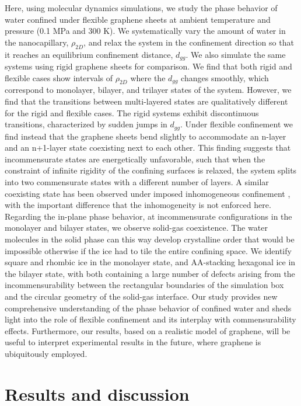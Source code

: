 \documentclass[journal=acsnano,manuscript=article]{achemso}
\begin{document}
	Here, using molecular dynamics simulations, we study the phase behavior of water confined under flexible graphene sheets at ambient temperature and pressure (0.1 MPa and 300 K). We systematically vary the amount of water in the nanocapillary, \(\rho_{2D}\), and relax the system in the confinement direction so that it reaches an equilibrium confinement distance, \(d_{gg}\). We also simulate the same systems using rigid graphene sheets for comparison. We find that both rigid and flexible cases show intervals of \(\rho_{2D}\) where the \(d_{gg}\) changes smoothly, which correspond to monolayer, bilayer, and trilayer states of the system. However, we find that the transitions between multi-layered states are qualitatively different for the rigid and flexible cases. The rigid systems exhibit discontinuous transitions, characterized by sudden jumps in \(d_{gg}\). Under flexible confinement we find instead that the graphene sheets bend slightly to accommodate an n-layer and an n+1-layer state coexisting next to each other. This finding suggests that incommensurate states are energetically unfavorable, such that when the constraint of infinite rigidity of the confining surfaces is relaxed, the system splits into two commensurate states with a different number of layers. A similar coexisting state has been observed under imposed inhomogeneous confinement \cite{Qiu2015}, with the important difference that the inhomogeneity is not enforced here. Regarding the in-plane phase behavior, at incommensurate configurations in the monolayer and bilayer states, we observe solid-gas coexistence. The water molecules in the solid phase can this way develop crystalline order that would be impossible otherwise if the ice had to tile the entire confining space. We identify square and rhombic ice in the monolayer state, and AA-stacking hexagonal ice in the bilayer state, with both containing a large number of defects arising from the incommensurability between the rectangular boundaries of the simulation box and the circular geometry of the solid-gas interface. Our study provides new comprehensive understanding of the phase behavior of confined water and sheds light into the role of flexible confinement and its interplay with commensurability effects. Furthermore, our results, based on a realistic model of graphene, will be useful to interpret experimental results in the future, where graphene is ubiquitously employed.

\section{Results and discussion}
\end{document}

